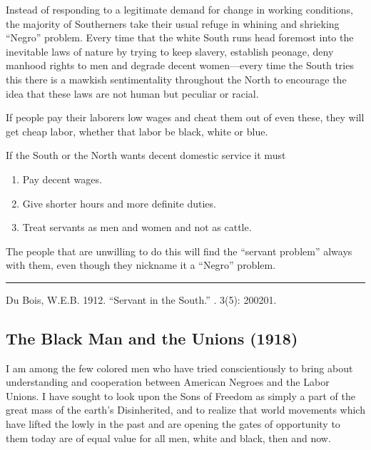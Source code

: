 \documentclass[letterpaper,10pt,english]{jupyterBook}
\begin{document}
\sphinxAtStartPar
Instead of responding to a legiti­mate demand for change in working conditions, the majority of South­erners take their usual refuge in whining and shrieking “Negro” problem. Every time that the white South runs head foremost into the inevitable laws of nature by trying to keep slavery, establish peonage, deny manhood rights to men and de­grade decent women—every time the
South tries this there is a mawkish sentimentality throughout the North to encourage the idea that these laws are not human but peculiar or racial.

\sphinxAtStartPar
If people pay their laborers low wages and cheat them out of even these, they will get cheap labor, whether that labor be black, white or blue.

\sphinxAtStartPar
If the South or the North wants de­cent domestic service it must
\begin{enumerate}
%
\item {} 
\sphinxAtStartPar
Pay decent wages.

\item {} 
\sphinxAtStartPar
Give shorter hours and more definite duties.

\item {} 
\sphinxAtStartPar
Treat servants as men and women and not as cattle.

\end{enumerate}

\sphinxAtStartPar
The people that are unwilling to do this will find the “servant problem” always with them, even though they nickname it a “Negro” problem.


\bigskip\hrule\bigskip


\sphinxAtStartPar
{} Du Bois, W.E.B. 1912. “Servant in the South.”  . 3(5): 200\sphinxhyphen{}201.


\subsection{The Black Man and the Unions (1918)}
\label{\detokenize{Volumes/15/05/the_black_man_and_the_unions:the-black-man-and-the-unions-1918}}\label{\detokenize{Volumes/15/05/the_black_man_and_the_unions::doc}}
\sphinxAtStartPar
I am among the few colored men who have tried conscientiously to bring about understanding and co\sphinxhyphen{}operation between American Negroes and the Labor Unions. I have sought to look upon the Sons of Freedom as simply a part of the great mass of the earth’s Disinherited, and to realize that world movements which have lifted the lowly in the past and are opening the gates of opportunity to them today are of equal value for all men, white and black, then and now.
\end{document}
